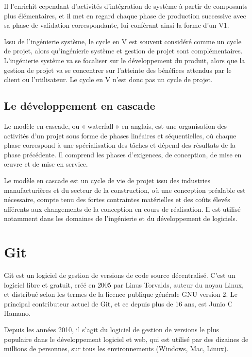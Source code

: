 Il l'enrichit cependant d'activités d'intégration de système à partir de composants plus
élémentaires, et il met en regard chaque phase de production successive avec sa phase de
validation correspondante, lui conférant ainsi la forme d'un V1.

Issu de l'ingénierie système, le cycle en V est souvent considéré comme un cycle de projet,
alors qu'ingénierie système et gestion de projet sont complémentaires. L'ingénierie système va se
focaliser sur le développement du produit, alors que la gestion de projet va se concentrer sur
l'atteinte des bénéfices attendus par le client ou l'utilisateur. Le cycle en V n'est donc pas un
cycle de projet.

\subsection{Le développement en cascade}\label{subsec:developpement-en-cascade}
Le modèle en cascade, ou « waterfall » en anglais, est une organisation des activités d'un projet
sous forme de phases linéaires et séquentielles, où chaque phase correspond à une spécialisation
des tâches et dépend des résultats de la phase précédente. Il comprend les phases d'exigences,
de conception, de mise en œuvre et de mise en service.

Le modèle en cascade est un cycle de vie de projet issu des industries manufacturières et du secteur
de la construction, où une conception préalable est nécessaire, compte tenu des fortes contraintes
matérielles et des coûts élevés afférents aux changements de la conception en cours de réalisation.
Il est utilisé notamment dans les domaines de l'ingénierie et du développement de logiciels.

\section{Git}\label{sec:git-1}
Git est un logiciel de gestion de versions de code source décentralisé. C'est un logiciel libre et gratuit,
créé en 2005 par Linus Torvalds, auteur du noyau Linux, et distribué selon les termes de la
licence publique générale GNU version 2. Le principal contributeur actuel de Git, et ce
depuis plus de 16 ans, est Junio C Hamano.

Depuis les années 2010, il s’agit du logiciel de gestion de versions le plus populaire dans
le développement logiciel et web, qui est utilisé par des dizaines de millions de personnes,
sur tous les environnements (Windows, Mac, Linux).

